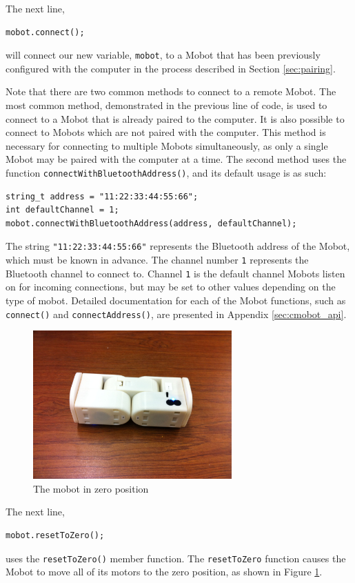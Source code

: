 \documentclass{article}
\begin{document}
The next line,
\begin{verbatim}
mobot.connect();
\end{verbatim}
will connect our new variable, \texttt{mobot}, to a
Mobot that has been previously configured with the computer in the 
process described in Section \ref{sec:pairing}.

Note that there are two common methods to connect to a remote Mobot. 
The most common method, demonstrated in the previous line of code, is
used to connect to a Mobot that is already paired to the computer. It
is also possible to connect to Mobots which are not paired with the 
computer. This method is necessary for connecting to multiple
Mobots simultaneously, as only a single Mobot may be paired with the
computer at a time. The second method uses the function
\texttt{connectWithBluetoothAddress()}, and its default usage is as such:
\begin{verbatim}
string_t address = "11:22:33:44:55:66";
int defaultChannel = 1;
mobot.connectWithBluetoothAddress(address, defaultChannel);
\end{verbatim}
The string \texttt{"11:22:33:44:55:66"} represents the Bluetooth address
of the Mobot, which must be known in advance. The channel number \texttt{1} 
represents the Bluetooth channel to connect to. Channel \texttt{1}
is the default channel Mobots listen on for incoming connections, but
may be set to other values depending on the type of mobot. Detailed
documentation for each of the Mobot functions, such as 
\texttt{connect()} and \texttt{connectAddress()}, are presented in
Appendix \ref{sec:cmobot_api}.

\begin{figure}
  \centering
  \includegraphics[width=3in]{images/inchworm1.jpg}
  \caption{The mobot in zero position}
  \label{fig:zeroposition}
\end{figure}

The next line,
\begin{verbatim}
mobot.resetToZero();
\end{verbatim}
uses the \texttt{resetToZero()} member function. The
\texttt{resetToZero} function causes the Mobot to move all of its motors to the
zero position, as shown in Figure \ref{fig:zeroposition}.
\end{document}
